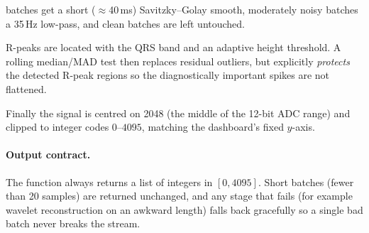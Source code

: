 \begin{description}[leftmargin=0pt,style=nextline]
        batches get a short ($\approx$40\,ms) Savitzky--Golay smooth, moderately
        noisy batches a 35\,Hz low-pass, and clean batches are left untouched.
  \item[7. R-peak-preserving outlier replacement] R-peaks are located with the QRS
        band and an adaptive height threshold. A rolling median/MAD test then
        replaces residual outliers, but explicitly \emph{protects} the detected
        R-peak regions so the diagnostically important spikes are not flattened.
  \item[8. Re-centre and clip] Finally the signal is centred on 2048 (the middle of
        the 12-bit ADC range) and clipped to integer codes $0$--$4095$, matching
        the dashboard's fixed $y$-axis.
\end{description}

\paragraph{Output contract.} The function always returns a list of integers in
$[0,4095]$. Short batches (fewer than 20 samples) are returned unchanged, and any
stage that fails (for example wavelet reconstruction on an awkward length) falls
back gracefully so a single bad batch never breaks the stream.
